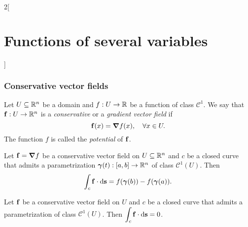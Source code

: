 \documentclass[../../../main.tex]{subfiles}
\begin{document}
\begin{multicols}{2}[\section{Functions of several variables}]
    \subsubsection*{Conservative vector fields}
    \begin{definition}
        Let $U\subseteq\mathbb{R}^n$ be a domain and $f:U\rightarrow\mathbb{R} $ be a function of class $\mathcal{C}^1$. We say that $\vb{f}:U\rightarrow\mathbb{R}^n$ is a \textit{conservative} or a \textit{gradient vector field} if $$\vb{f}(x)=\grad f(x),\quad \forall x\in U.$$ The function $f$ is called the \textit{potential} of $\vb{f}$.
    \end{definition}
    \begin{theorem}
        Let $\vb{f}=\grad f$ be a conservative vector field on $U\subseteq\mathbb{R}^n$ and $c$ be a closed curve that admits a parametrization $\boldsymbol{\gamma}(t):[a,b]\rightarrow\mathbb{R}^n$ of class $\mathcal{C}^1(U)$. Then $$\int_c\vb{f}\cdot \dd \textbf{s}=f(\boldsymbol{\gamma}(b))-f(\boldsymbol{\gamma}(a)).$$
    \end{theorem}
    \begin{corollary}
        Let $\vb{f}$ be a conservative vector field on $U$ and $c$ be a closed curve that admits a parametrization of class $\mathcal{C}^1(U)$. Then $\displaystyle\int_c\vb{f}\cdot \dd \textbf{s}=0$.
    \end{corollary}

\end{multicols}
\end{document}
